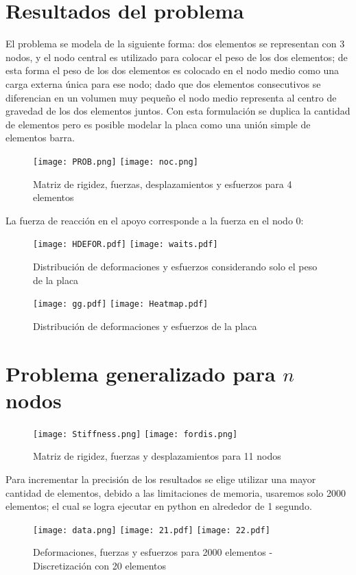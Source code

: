 \documentclass[12pt,a3paper]{article}
\begin{document}
\section{Resultados del problema}
El problema se modela de la siguiente forma: dos elementos se representan con 3 nodos, y el nodo central es utilizado para colocar el peso de los dos elementos; de esta forma el peso de los dos elementos es colocado en el nodo medio como una carga externa única para ese nodo; dado que dos elementos consecutivos se diferencian en un volumen muy pequeño el nodo medio representa al centro de gravedad de los dos elementos juntos. Con esta formulación se duplica la cantidad de elementos pero es posible modelar la placa como una unión simple de elementos barra.
\begin{figure}[H]
\begin{center}
\texttt{[image: PROB.png]}
\texttt{[image: noc.png]}
\caption{Matriz de rigidez, fuerzas, desplazamientos y esfuerzos para 4 elementos}
\end{center}
\end{figure}
La fuerza de reacción en el apoyo corresponde a la fuerza en el nodo 0: 
\begin{figure}[H]
\begin{center}
\texttt{[image: HDEFOR.pdf]}
\texttt{[image: waits.pdf]}
\caption{Distribución de deformaciones y esfuerzos considerando solo el peso de la placa}
\end{center}
\end{figure}
\begin{figure}[H]
\begin{center}
\texttt{[image: gg.pdf]}
\texttt{[image: Heatmap.pdf]}
\caption{Distribución de deformaciones y esfuerzos de la placa}
\end{center}
\end{figure}
\section{Problema generalizado para $n$ nodos}
\begin{figure}[H]
\begin{center}
\texttt{[image: Stiffness.png]}
\texttt{[image: fordis.png]}
\caption{Matriz de rigidez, fuerzas y desplazamientos para 11 nodos}
\end{center}
\end{figure}
Para incrementar la precisión de los resultados se elige utilizar una mayor cantidad de elementos, debido a las limitaciones de memoria, usaremos solo 2000 elementos; el cual se logra ejecutar en python en alrededor de 1 segundo.
\begin{figure}[H]
\begin{center}
\texttt{[image: data.png]}
\texttt{[image: 21.pdf]}
\texttt{[image: 22.pdf]}
\caption{Deformaciones, fuerzas y esfuerzos para 2000 elementos - Discretización con 20 elementos}
\end{center}
\end{figure}
\end{document}
